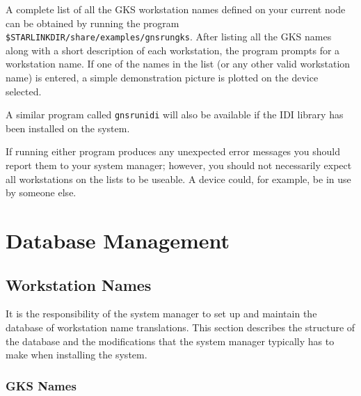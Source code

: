 \documentclass[twoside,11pt]{article}
\renewcommand{\_}{\texttt{\symbol{95}}}
\begin{document}
A complete list of all the GKS workstation names defined on your current node
can be obtained by running the program 
\texttt{\$STARLINK\_DIR/share/examples/gnsrun\_gks}.
After listing all the GKS names along with a short description of each
workstation, the program prompts for a workstation name. If one of the names
in the list (or any other valid workstation name) is entered, a simple
demonstration picture is plotted on the device selected.

A similar program called {\tt gnsrun\_idi} will also be available if the
IDI library has been installed on the system.

If running either program produces any unexpected error messages
you should report them to your system manager; however, you should not
necessarily expect all workstations on the lists to be useable. A device could,
for example, be in use by someone else.

\section{Database Management}\label{dm}
\subsection{Workstation Names}\label{dwn}

It is the responsibility of the system manager to set up and maintain the
database of workstation name translations.
This section describes the structure of the database and the modifications
that the system manager typically has to make when installing the system.

\subsubsection{GKS Names}\label{GKS-names}
\end{document}
